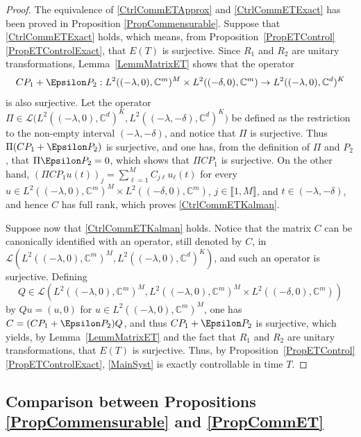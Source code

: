 \begin{proof}
The equivalence of \eqref{CtrlCommETApprox} and \eqref{CtrlCommETExact} has been proved in Proposition \ref{PropCommensurable}. Suppose that \eqref{CtrlCommETExact} holds, which means, from Proposition~\ref{PropETControl}\eqref{PropETControlExact}, that $E(T)$ is surjective. Since $R_1$ and $R_2$ are unitary transformations, Lemma~\ref{LemmMatrixET} shows that the operator
\[
C P_1 + \Epsilon P_2: L^2((-\lambda, 0), \mathbb C^m)^M \times L^2((-\delta, 0), \mathbb C^m) \to L^2((-\lambda, 0), \mathbb C^d)^K
\]
is also surjective. Let the operator $\Pi \in \mathcal L\bigl(L^2((-\lambda, 0), \mathbb C^d)^K, L^2((-\lambda, -\delta), \mathbb C^d)^K\bigr)$ be defined as the restriction to the non-empty interval $(-\lambda, -\delta)$, and notice that $\Pi$ is surjective. Thus $\Pi(C P_1 + \Epsilon P_2)$ is surjective, and one has, from the definition of $\Pi$ and $P_2$, that $\Pi \Epsilon P_2 = 0$, which shows that $\Pi C P_1$ is surjective. On the other hand, $(\Pi C P_1 u(t))_j = \sum_{\ell=1}^M C_{j\ell} u_\ell(t)$ for every $u \in L^2((-\lambda, 0), \mathbb C^m)^M \times L^2((-\delta, 0), \mathbb C^m)$, $j \in \llbracket 1, M\rrbracket$, and $t \in (-\lambda, -\delta)$, and hence $C$ has full rank, which proves \eqref{CtrlCommETKalman}.

Suppose now that \eqref{CtrlCommETKalman} holds. Notice that the matrix $C$ can be canonically identified with an operator, still denoted by $C$, in $\mathcal L\left(L^2((-\lambda, 0), \mathbb C^m)^M, L^2((-\lambda, 0), \mathbb C^d)^K\right)$, and such an operator is surjective. Defining
\[
Q \in \mathcal L(L^2((-\lambda, 0), \mathbb C^m)^M, L^2((-\lambda, 0), \mathbb C^m)^M \times L^2((-\delta, 0), \mathbb C^m))
\]
by $Q u = (u, 0)$ for $u \in L^2((-\lambda, 0), \mathbb C^m)^M$, one has $C = (C P_1 + \Epsilon P_2) Q$, and thus $C P_1 + \Epsilon P_2$ is surjective, which yields, by Lemma~\ref{LemmMatrixET} and the fact that $R_1$ and $R_2$ are unitary transformations, that $E(T)$ is surjective. Thus, by Proposition~\ref{PropETControl}\eqref{PropETControlExact}, \eqref{MainSyst} is exactly controllable in time $T$.
\end{proof}

\subsection{Comparison between Propositions \ref{PropCommensurable} and \ref{PropCommET}}

